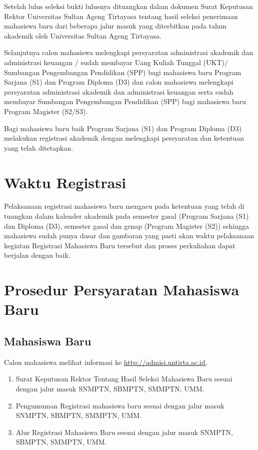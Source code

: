 \documentclass[
]{book}
\providecommand{\tightlist}{%
  \setlength{\itemsep}{0pt}\setlength{\parskip}{0pt}}
\begin{document}
Setelah lulus seleksi bukti lulusnya dituangkan dalam dokumen Surat Keputusan Rektor Universitas Sultan Ageng Tirtayasa tentang hasil seleksi penerimaan mahasiswa baru dari beberapa jalur masuk yang diterbitkan pada tahun akademik oleh Universitas Sultan Ageng Tirtayasa.

Selanjutnya calon mahasiswa melengkapi persyaratan administrasi akademik dan administrasi keuangan / sudah membayar Uang Kuliah Tunggal (UKT)/ Sumbangan Pengembangan Pendidikan (SPP) bagi mahasiswa baru Program Sarjana (S1) dan Program Diploma (D3) dan calon mahasiswa melengkapi persyaratan administrasi akademik dan administrasi keuangan serta sudah membayar Sumbangan Pengembangan Pendidikan (SPP) bagi mahasiswa baru Program Magister (S2/S3).

Bagi mahasiswa baru baik Program Sarjana (S1) dan Program Diploma (D3) melakukan registrasi akademik dengan melengkapi persyaratan dan ketentuan yang telah ditetapkan.

\hypertarget{waktu-registrasi}{%
\section{Waktu Registrasi}\label{waktu-registrasi}}

Pelaksanaan registrasi mahasiswa baru mengacu pada ketentuan yang telah di tuangkan dalam kalender akademik pada semester gasal (Program Sarjana (S1) dan Diploma (D3), semester gasal dan genap (Program Magister (S2)) sehingga mahasiswa sudah punya dasar dan gambaran yang pasti akan waktu pelaksanaan kegiatan Registrasi Mahasiswa Baru tersebut dan proses perkuliahan dapat berjalan dengan baik.

\hypertarget{prosedur-persyaratan-mahasiswa-baru}{%
\section{Prosedur Persyaratan Mahasiswa Baru}\label{prosedur-persyaratan-mahasiswa-baru}}

\hypertarget{mahasiswa-baru}{%
\subsection{Mahasiswa Baru}\label{mahasiswa-baru}}

Calon mahasiswa melihat informasi ke \url{http://admisi.untirta.ac.id},

\begin{enumerate}
\def\labelenumi{\alph{enumi}.}
\tightlist
\item
  Surat Keputusan Rektor Tentang Hasil Seleksi Mahasiswa Baru sesuai dengan jalur masuk SNMPTN, SBMPTN, SMMPTN, UMM.
\item
  Pengumuman Registrasi mahasiswa baru sesuai dengan jalur masuk SNMPTN, SBMPTN, SMMPTN, UMM.
\item
  Alur Registrasi Mahasiswa Baru sesuai dengan jalur masuk SNMPTN, SBMPTN, SMMPTN, UMM.
\end{enumerate}
\end{document}
